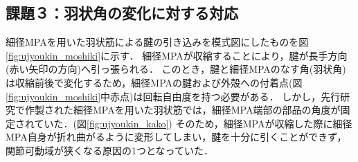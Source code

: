 \subsection{課題３：羽状角の変化に対する対応}
細径MPAを用いた羽状筋による腱の引き込みを模式図にしたものを図\ref{fig:ujyoukin_moshiki}に示す．
細径MPAが収縮することにより，腱が長手方向(赤い矢印の方向)へ引っ張られる．
このとき，腱と細径MPAのなす角(羽状角)は収縮前後で変化するため，細径MPAの腱および外殻への付着点(図\ref{fig:ujyoukin_moshiki}中赤点)は回転自由度を持つ必要がある．
しかし，先行研究\cite{hasegawa}で作製された細径MPAを用いた羽状筋では，細径MPA端部の部品の角度が固定されていた．(図\ref{fig:ujyoukin_kako})
そのため，細径MPAが収縮した際に細径MPA自身が折れ曲がるように変形してしまい，腱を十分に引くことができず，関節可動域が狭くなる原因の1つとなっていた．

